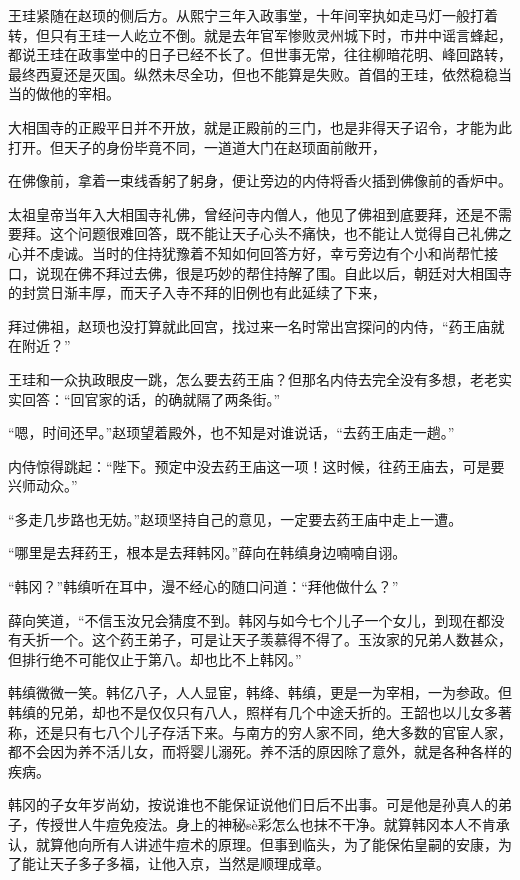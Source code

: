 王珪紧随在赵顼的侧后方。从熙宁三年入政事堂，十年间宰执如走马灯一般打着转，但只有王珪一人屹立不倒。就是去年官军惨败灵州城下时，市井中谣言蜂起，都说王珪在政事堂中的日子已经不长了。但世事无常，往往柳暗花明、峰回路转，最终西夏还是灭国。纵然未尽全功，但也不能算是失败。首倡的王珪，依然稳稳当当的做他的宰相。

大相国寺的正殿平日并不开放，就是正殿前的三门，也是非得天子诏令，才能为此打开。但天子的身份毕竟不同，一道道大门在赵顼面前敞开，

在佛像前，拿着一束线香躬了躬身，便让旁边的内侍将香火插到佛像前的香炉中。

太祖皇帝当年入大相国寺礼佛，曾经问寺内僧人，他见了佛祖到底要拜，还是不需要拜。这个问题很难回答，既不能让天子心头不痛快，也不能让人觉得自己礼佛之心并不虔诚。当时的住持犹豫着不知如何回答方好，幸亏旁边有个小和尚帮忙接口，说现在佛不拜过去佛，很是巧妙的帮住持解了围。自此以后，朝廷对大相国寺的封赏日渐丰厚，而天子入寺不拜的旧例也有此延续了下来，

拜过佛祖，赵顼也没打算就此回宫，找过来一名时常出宫探问的内侍，“药王庙就在附近？”

王珪和一众执政眼皮一跳，怎么要去药王庙？但那名内侍去完全没有多想，老老实实回答：“回官家的话，的确就隔了两条街。”

“嗯，时间还早。”赵顼望着殿外，也不知是对谁说话，“去药王庙走一趟。”

内侍惊得跳起：“陛下。预定中没去药王庙这一项！这时候，往药王庙去，可是要兴师动众。”

“多走几步路也无妨。”赵顼坚持自己的意见，一定要去药王庙中走上一遭。

“哪里是去拜药王，根本是去拜韩冈。”薛向在韩缜身边喃喃自诩。

“韩冈？”韩缜听在耳中，漫不经心的随口问道：“拜他做什么？”

薛向笑道，“不信玉汝兄会猜度不到。韩冈与如今七个儿子一个女儿，到现在都没有夭折一个。这个药王弟子，可是让天子羡慕得不得了。玉汝家的兄弟人数甚众，但排行绝不可能仅止于第八。却也比不上韩冈。”

韩缜微微一笑。韩亿八子，人人显宦，韩绛、韩缜，更是一为宰相，一为参政。但韩缜的兄弟，却也不是仅仅只有八人，照样有几个中途夭折的。王韶也以儿女多著称，还是只有七八个儿子存活下来。与南方的穷人家不同，绝大多数的官宦人家，都不会因为养不活儿女，而将婴儿溺死。养不活的原因除了意外，就是各种各样的疾病。

韩冈的子女年岁尚幼，按说谁也不能保证说他们日后不出事。可是他是孙真人的弟子，传授世人牛痘免疫法。身上的神秘sè彩怎么也抹不干净。就算韩冈本人不肯承认，就算他向所有人讲述牛痘术的原理。但事到临头，为了能保佑皇嗣的安康，为了能让天子多子多福，让他入京，当然是顺理成章。


